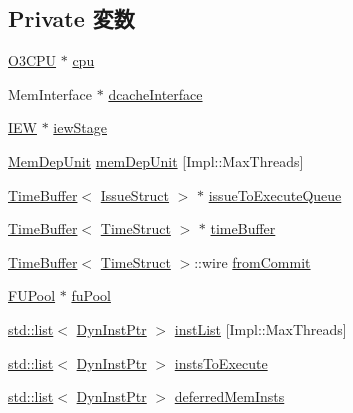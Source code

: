 \subsection*{Private 変数}
\begin{DoxyCompactItemize}
\item 
\hyperlink{classInstructionQueue_a44622cf06940413482836cb62931ac3f}{O3CPU} $\ast$ \hyperlink{classInstructionQueue_a1379cf882a12ac6fc9eba5da7c84b18b}{cpu}
\item 
MemInterface $\ast$ \hyperlink{classInstructionQueue_a22dc8294eecb144fbdd951d2e32e9330}{dcacheInterface}
\item 
\hyperlink{classInstructionQueue_a23f60a4095b5240dfcb18a4ec40210a9}{IEW} $\ast$ \hyperlink{classInstructionQueue_a4e9ef25d8913b270d432be4bbfe4965c}{iewStage}
\item 
\hyperlink{classMemDepUnit}{MemDepUnit} \hyperlink{classInstructionQueue_a8cb80ccbf6ed6c1029c6d9ebeaa40f6e}{memDepUnit} \mbox{[}Impl::MaxThreads\mbox{]}
\item 
\hyperlink{classTimeBuffer}{TimeBuffer}$<$ \hyperlink{structIssueStruct}{IssueStruct} $>$ $\ast$ \hyperlink{classInstructionQueue_af5c55240e63d9a13358eede4eb5352f1}{issueToExecuteQueue}
\item 
\hyperlink{classTimeBuffer}{TimeBuffer}$<$ \hyperlink{structTimeStruct}{TimeStruct} $>$ $\ast$ \hyperlink{classInstructionQueue_a83f9ee976e732665aeb08dbc19acfd45}{timeBuffer}
\item 
\hyperlink{classTimeBuffer}{TimeBuffer}$<$ \hyperlink{structTimeStruct}{TimeStruct} $>$::wire \hyperlink{classInstructionQueue_a0055a92bd94eda21c2641d46ff013dac}{fromCommit}
\item 
\hyperlink{classFUPool}{FUPool} $\ast$ \hyperlink{classInstructionQueue_a480782fc1cfd21fd9748b26f2a08b97a}{fuPool}
\item 
\hyperlink{classstd_1_1list}{std::list}$<$ \hyperlink{classInstructionQueue_a028ce10889c5f6450239d9e9a7347976}{DynInstPtr} $>$ \hyperlink{classInstructionQueue_a7f2828a4f877a4a4d4b85a6788536b82}{instList} \mbox{[}Impl::MaxThreads\mbox{]}
\item 
\hyperlink{classstd_1_1list}{std::list}$<$ \hyperlink{classInstructionQueue_a028ce10889c5f6450239d9e9a7347976}{DynInstPtr} $>$ \hyperlink{classInstructionQueue_a494cb455333d9f34ee4a3ab8ca5e50fd}{instsToExecute}
\item 
\hyperlink{classstd_1_1list}{std::list}$<$ \hyperlink{classInstructionQueue_a028ce10889c5f6450239d9e9a7347976}{DynInstPtr} $>$ \hyperlink{classInstructionQueue_a6ea0c1a972364b789a8b6831cf7828cf}{deferredMemInsts}

\end{DoxyCompactItemize}
